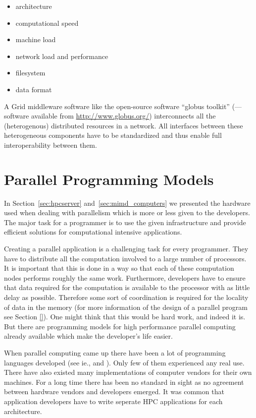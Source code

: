 \begin{itemize}
\item architecture
\item computational speed
\item machine load
\item network load and performance
\item filesystem
\item data format
\end{itemize}

A Grid middleware software like the open-source software ``globus
toolkit'' (\cite{foster97gmi}---software available from
\url{http://www.globus.org/}) interconnects all the (heterogenous)
distributed resources in a network.
All interfaces between these heterogeneous components have to be standardized
and thus enable full interoperability between them.

\section{Parallel Programming Models}
\label{sec:programming_models}

In Section~\ref{sec:hpcserver} and~\ref{sec:mimd_computers} we
presented the hardware used when dealing with parallelism which is
more or less given to the developers. The major task for a programmer
is to use the given infrastructure and provide efficient solutions for
computational intensive applications.

Creating a parallel application is a challenging task for every
programmer. They have to distribute all
the computation involved to a large number of processors. It is
important that this is done in a way so that each of these computation
nodes performs roughly the same work. Furthermore, developers have to
ensure that data required for the computation is available to the
processor with as little delay as possible. Therefore some sort of
coordination is required for the locality of data in the memory (for
more information of the design of a parallel program see Section \ref{}).
One might think that this would be hard work, and indeed it is. But
there are programming models for high performance parallel computing
already available which make the developer's life easier.


When parallel computing came up there have been a lot of programming
languages developed (see ie., \cite{gehani88:concurrentprog} and
\cite{wilson96:parallelprog}). Only few of them experienced any real use. There
have also existed many implementations of computer vendors for their own
machines. For a long time there has been no standard in sight as no
agreement between hardware vendors and developers emerged. It was
common that application developers have to write seperate HPC
applications for each architecture.

